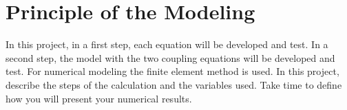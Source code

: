 	
\section{Principle of the Modeling}
In this project, in a first step, each equation will be developed and test. In a second step, the model with the
two coupling equations will be developed and test. For numerical modeling the finite element method is
used. In this project, describe the steps of the calculation and the variables used. Take time to define how you
will present your numerical results.
